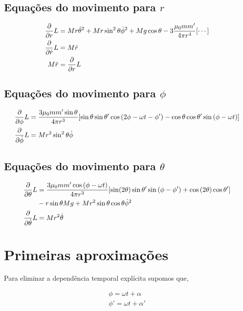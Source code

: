 \documentclass[a4paper, 12pt]{article}
\begin{document}
\subsection{Equações do movimento para $r$}

\begin{align}
    \pdv{}{r}L&=Mr\dot{\theta}^2+Mr\sin^2\theta\dot{\phi}^2+Mg\cos\theta-3\frac{\mu_0mm'}{4\pi r^4}\qty[\cdots]\nonumber\\
    \pdv{}{\dot{r}}L&=M\dot{r}\nonumber\\
    M\ddot{r}&=\pdv{}{r}L
\end{align}

\subsection{Equações do movimento para $\phi$}

\begin{align}
    \pdv{}{\phi}L&=\frac{3\mu_0mm'\sin\theta}{4\pi r^3}\qty[\sin\theta\sin\theta'\cos\qty(2\phi-\omega t-\phi')-\cos\theta\cos\theta'\sin\qty(\phi-\omega t)]\nonumber\\
    \pdv{}{\dot{\phi}}L&=Mr^2\sin^2\theta\dot{\phi}\nonumber
\end{align}

\subsection{Equações do movimento para $\theta$}

\begin{align}
    \pdv{}{\theta}L&=\frac{3\mu_0mm'\cos\qty(\phi-\omega t)}{4\pi r^3}\qty[\sin(2\theta)\sin\theta'\sin\qty(\phi-\phi')+\cos\qty(2\theta)\cos\theta']\nonumber\\
    &-r\sin\theta Mg+Mr^2\sin\theta\cos\theta\dot{\phi}^2\nonumber\\
    \pdv{}{\dot{\theta}}L&=Mr^2\dot{\theta}\nonumber
\end{align}

\section{Primeiras aproximações}

Para eliminar a dependência temporal explícita supomos que, 

\begin{align}
    \phi = \omega t+ \alpha\\
    \phi' = \omega t +\alpha'
\end{align}
\end{document}
